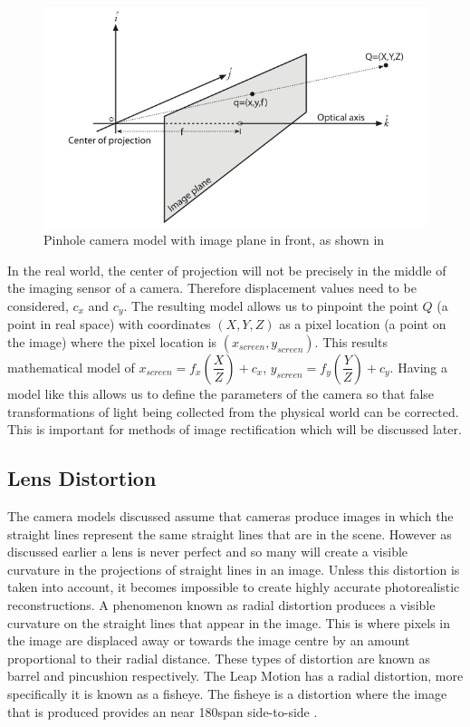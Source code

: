 \documentclass[11pt,oneside]{report}
\begin{document}
				\begin{figure}[!ht]
				\begin{center}
					\includegraphics[width=\textwidth]{pinhole2}
					\caption{Pinhole camera model with image plane in front, as shown in \protect{} {\label{fig:pinhole2}}}
				\end{center}
				\end{figure}
				In the real world, the center of projection will not be precisely in the middle of the imaging sensor of a camera.
				Therefore displacement values need to be considered, $c_{x}$ and $c_{y}$.
				The resulting model allows us to pinpoint the point $Q$ (a point in real space) with coordinates $(X,Y,Z)$ as a pixel location (a point on the image) where the pixel location is $(x_{screen}, y_{screen})$.
				This results mathematical model of $x_{screen}=f_{x}\left(\dfrac{X}{Z}\right)+c_{x}$, $y_{screen}=f_{y}\left(\dfrac{Y}{Z}\right)+c_{y}$.
				Having a model like this allows us to define the parameters of the camera so that false transformations of light being collected from the physical world can be corrected.
				This is important for methods of image rectification which will be discussed later.
				\subsection{Lens Distortion}
					The camera models discussed assume that cameras produce images in which the straight lines represent the same straight lines that are in the scene.
					However as discussed earlier a lens is never perfect and so many will create a visible curvature in the projections of straight lines in an image.
					Unless this distortion is taken into account, it becomes impossible to create highly accurate photorealistic reconstructions.
					A phenomenon known as radial distortion produces a visible curvature on the straight lines that appear in the image.
					This is where pixels in the image are displaced away or towards the image centre by an amount proportional to their radial distance.
					These types of distortion are known as barrel and pincushion respectively.
					The Leap Motion has a radial distortion, more specifically it is known as a fisheye.
					The fisheye is a distortion where the image that is produced provides an near 180\degree span side-to-side \cite{book:sam}.
					
\end{document}
